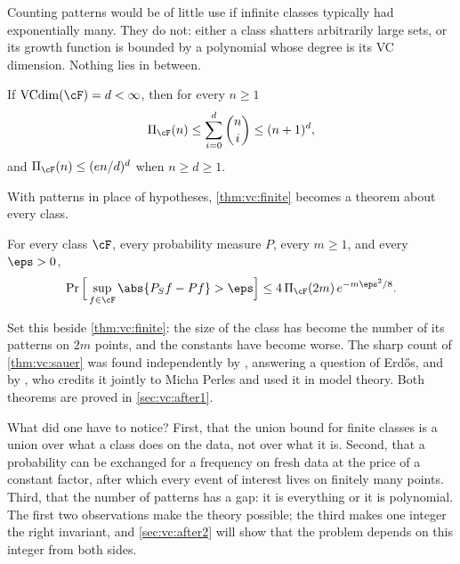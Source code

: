 \begin{refsection}
Counting patterns would be of little use if infinite classes typically had exponentially many. They do not: either a class shatters arbitrarily large sets, or its growth function is bounded by a polynomial whose degree is its VC dimension. Nothing lies in between.

\begin{theorem}\label{thm:vc:sauer}
If $\vcdim(\cF) = d<\infty$, then for every $n\ge1$
\[
  \vcGrowth_{\cF}(n)\le\sum_{i=0}^d\binom ni\le(n+1)^d ,
\]
and $\vcGrowth_{\cF}(n)\le(en/d)^d$ when $n\ge d\ge1$.
\end{theorem}

With patterns in place of hypotheses, \cref{thm:vc:finite} becomes a theorem about every class.

\begin{theorem}\label{thm:vc:vc}
For every class $\cF$, every probability measure $P$, every $m\ge1$, and every $\eps>0$,
\begin{equation}\label{eq:vc:vc}
  \Pr\Big[\sup_{f\in\cF}\abs{P_Sf-Pf}>\eps\Big]\le4\,\vcGrowth_{\cF}(2m)\,e^{-m\eps^2/8} .
\end{equation}
\end{theorem}

Set this beside \cref{thm:vc:finite}: the size of the class has become the number of its patterns on $2m$ points, and the constants have become worse. The sharp count of \cref{thm:vc:sauer} was found independently by \textcite{Sauer1972}, answering a question of Erd\H{o}s, and by \textcite{Shelah1972}, who credits it jointly to Micha Perles and used it in model theory. Both theorems are proved in \cref{sec:vc:after1}.

What did one have to notice? First, that the union bound for finite classes is a union over what a class does on the data, not over what it is. Second, that a probability can be exchanged for a frequency on fresh data at the price of a constant factor, after which every event of interest lives on finitely many points. Third, that the number of patterns has a gap: it is everything or it is polynomial. The first two observations make the theory possible; the third makes one integer the right invariant, and \cref{sec:vc:after2} will show that the problem depends on this integer from both sides.


\end{refsection}
